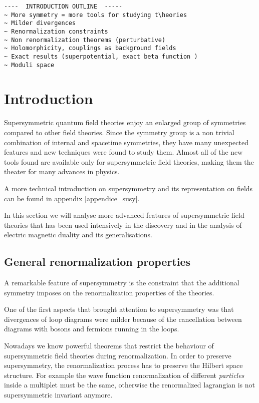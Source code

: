 \begin{lstlisting}
----  INTRODUCTION OUTLINE  -----
~ More symmetry = more tools for studying t\heories
~ Milder divergences 
~ Renormalization constraints
~ Non renormalization theorems (perturbative)
~ Holomorphicity, couplings as background fields 
~ Exact results (superpotential, exact beta function )
~ Moduli space
\end{lstlisting}





\section{Introduction}
Supersymmetric quantum field theories enjoy an enlarged group of  symmetries compared to other field theories. 
Since the symmetry group is a non trivial combination of internal and spacetime symmetries, they have many unexpected features and new techniques were found to study them.
Almost all of the new tools found are available only for supersymmetric field theories, making them the theater for many advances in physics. 

A more technical introduction on supersymmetry and its representation on fields can be found in appendix \ref{appendice_susy}.

In this section we will analyse more advanced features of supersymmetric field theories that has been used intensively in the discovery and in the analysis of electric magnetic duality and its generalisations.














\subsection{General renormalization properties}

A remarkable feature of supersymmetry is the constraint that the additional symmetry imposes on the renormalization properties of the theories.

One of the first aspects that brought attention to supersymmetry was that divergences of loop diagrams were milder because of the cancellation between diagrams with bosons and fermions running in the loops. 

Nowadays we know powerful theorems that restrict the behaviour of supersymmetric field theories during renormalization.
In order to preserve supersymmetry, the renormalization process has to preserve the Hilbert space structure. For example the wave function renormalization of different \emph{particles} inside a multiplet must be the same, otherwise the renormalized lagrangian is not supersymmetric invariant anymore. 

